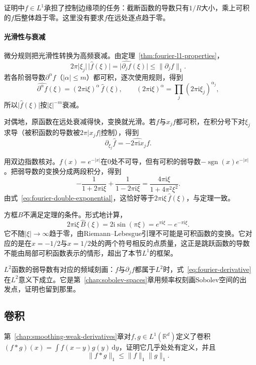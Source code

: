 证明中$f\in L^1$承担了控制边缘项的任务：截断函数的导数只有$1/R$大小，乘上可积的$f$后整体趋于零。这里没有要求$f$在远处逐点趋于零。

\paragraph{光滑性与衰减}

微分规则把光滑性转换为高频衰减。由定理~\ref{thm:fourier-l1-properties}，
\[
2\pi\lvert\xi_j\rvert\,\lvert\widehat f(\xi)\rvert=\lvert\widehat{\partial_jf}(\xi)\rvert\leq\lVert\partial_jf\rVert_1 .
\]
若各阶弱导数$\partial^\alpha f$（$\lvert\alpha\rvert\leq m$）都可积，逐次使用规则，得到
\[
\widehat{\partial^\alpha f}(\xi)=(2\pi\mathrm i\xi)^\alpha\,\widehat f(\xi),\qquad
(2\pi\mathrm i\xi)^\alpha=\prod_j(2\pi\mathrm i\xi_j)^{\alpha_j},
\]
所以$\lvert\widehat f(\xi)\rvert$按$\lvert\xi\rvert^{-m}$衰减。

对偶地，原函数在远处衰减得快，变换就光滑。若$f$与$x_jf$都可积，在积分号下对$\xi_j$求导（被积函数的导数被$2\pi\lvert x_jf\rvert$控制），得到
\[
\partial_{\xi_j}\widehat f=\widehat{-2\pi\mathrm ix_jf}.
\]

用双边指数核对。$f(x)=e^{-\lvert x\rvert}$在$0$处不可导，但有可积的弱导数$-\operatorname{sgn}(x)e^{-\lvert x\rvert}$。把弱导数的变换分成两段积分，得到
\[
-\frac1{1+2\pi\mathrm i\xi}+\frac1{1-2\pi\mathrm i\xi}=\frac{4\pi\mathrm i\xi}{1+4\pi^2\xi^2}.
\]
由式~\eqref{eq:fourier-double-exponential}，这恰好等于$2\pi\mathrm i\xi\,\widehat f(\xi)$，与定理一致。

方框$B$不满足定理的条件。形式地计算，
\[
2\pi\mathrm i\xi\,\widehat B(\xi)=2\mathrm i\sin(\pi\xi)=e^{\pi\mathrm i\xi}-e^{-\pi\mathrm i\xi}.
\]
它不随$\lvert\xi\rvert\to\infty$趋于零，由Riemann--Lebesgue引理不可能是可积函数的变换。它对应的是在$x=-1/2$与$x=1/2$处的两个符号相反的点质量，这正是跳跃函数的导数不能由局部可积函数表示的情形，超出了本节$L^1$的框架。

$L^2$函数的弱导数有对应的频域刻画：$f$与$\partial_jf$都属于$L^2$时，式~\eqref{eq:fourier-derivative}在$L^2$意义下成立。它是第~\ref{chap:sobolev-spaces}章用频率权刻画Sobolev空间的出发点，证明也留到那里。

\subsection{卷积}
\label{sec:fourier-convolution}

第~\ref{chap:smoothing-weak-derivatives}章对$f,g\in L^1(\mathbb R^d)$定义了卷积$(f*g)(x)=\int f(x-y)g(y)\,\mathrm dy$，证明它几乎处处有定义，并且
\[
\lVert f*g\rVert_1\leq\lVert f\rVert_1\lVert g\rVert_1.
\]


